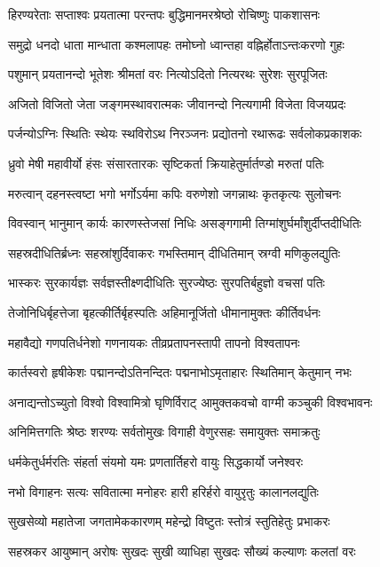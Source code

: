 \twolineshloka
{हिरण्यरेताः सप्ताश्वः प्रयतात्मा परन्तपः}
{बुद्धिमानमरश्रेष्ठो रोचिष्णुः पाकशासनः}%

\twolineshloka
{समुद्रो धनदो धाता मान्धाता कश्मलापहः}
{तमोघ्नो ध्वान्तहा वह्निर्होताऽन्तःकरणो गुहः}%

\twolineshloka
{पशुमान् प्रयतानन्दो भूतेशः श्रीमतां वरः}
{नित्योऽदितो नित्यरथः सुरेशः सुरपूजितः}%

\twolineshloka
{अजितो विजितो जेता जङ्गमस्थावरात्मकः}
{जीवानन्दो नित्यगामी विजेता विजयप्रदः}%

\twolineshloka
{पर्जन्योऽग्निः स्थितिः स्थेयः स्थविरोऽथ निरञ्जनः}
{प्रद्योतनो रथारूढः सर्वलोकप्रकाशकः}%

\twolineshloka
{ध्रुवो मेषी महावीर्यो हंसः संसारतारकः}
{सृष्टिकर्ता क्रियाहेतुर्मार्तण्डो मरुतां पतिः}%

\twolineshloka
{मरुत्वान् दहनस्त्वष्टा भगो भर्गोऽर्यमा कपिः}
{वरुणेशो जगन्नाथः कृतकृत्यः सुलोचनः}%

\twolineshloka
{विवस्वान् भानुमान् कार्यः कारणस्तेजसां निधिः}
{असङ्गगामी तिग्मांशुर्घर्मांशुर्दीप्तदीधितिः}%

\twolineshloka
{सहस्रदीधितिर्ब्रध्नः सहस्रांशुर्दिवाकरः}
{गभस्तिमान् दीधितिमान् स्रग्वी मणिकुलद्युतिः}%

\twolineshloka
{भास्करः सुरकार्यज्ञः सर्वज्ञस्तीक्ष्णदीधितिः}
{सुरज्येष्ठः सुरपतिर्बहुज्ञो वचसां पतिः}%

\twolineshloka
{तेजोनिधिर्बृहत्तेजा बृहत्कीर्तिर्बृहस्पतिः}
{अहिमानूर्जितो धीमानामुक्तः कीर्तिवर्धनः}%

\twolineshloka
{महावैद्यो गणपतिर्धनेशो गणनायकः}
{तीव्रप्रतापनस्तापी तापनो विश्वतापनः}%

\twolineshloka
{कार्तस्वरो हृषीकेशः पद्मानन्दोऽतिनन्दितः}
{पद्मनाभोऽमृताहारः स्थितिमान् केतुमान् नभः}%

\twolineshloka
{अनाद्यन्तोऽच्युतो विश्वो विश्वामित्रो घृणिर्विराट्}
{आमुक्तकवचो वाग्मी कञ्चुकी विश्वभावनः}%

\twolineshloka
{अनिमित्तगतिः श्रेष्ठः शरण्यः सर्वतोमुखः}
{विगाही वेणुरसहः समायुक्तः समाक्रतुः}%

\twolineshloka
{धर्मकेतुर्धर्मरतिः संहर्ता संयमो यमः}
{प्रणतार्तिहरो वायुः सिद्धकार्यो जनेश्वरः}%

\twolineshloka
{नभो विगाहनः सत्यः सवितात्मा मनोहरः}
{हारी हरिर्हरो वायुरृतुः कालानलद्युतिः}%

\twolineshloka
{सुखसेव्यो महातेजा जगतामेककारणम्}
{महेन्द्रो विष्टुतः स्तोत्रं स्तुतिहेतुः प्रभाकरः}%

\twolineshloka
{सहस्रकर आयुष्मान् अरोषः सुखदः सुखी}
{व्याधिहा सुखदः सौख्यं कल्याणः कलतां वरः}%

